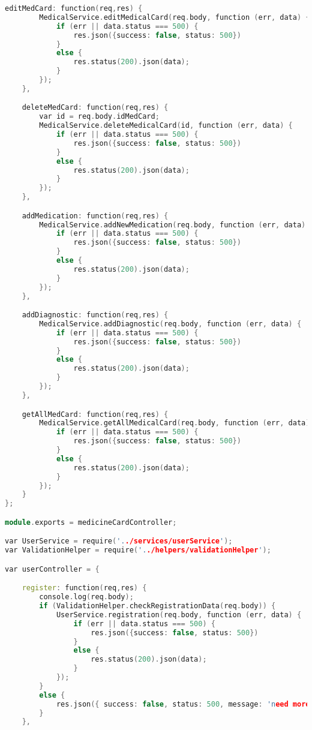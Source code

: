 \begin{lstlisting}[language=C++, style=cplusplusstyle]
    editMedCard: function(req,res) {
        MedicalService.editMedicalCard(req.body, function (err, data) {
            if (err || data.status === 500) {
                res.json({success: false, status: 500})
            }
            else {
                res.status(200).json(data);
            }
        });
    },

    deleteMedCard: function(req,res) {
        var id = req.body.idMedCard;
        MedicalService.deleteMedicalCard(id, function (err, data) {
            if (err || data.status === 500) {
                res.json({success: false, status: 500})
            }
            else {
                res.status(200).json(data);
            }
        });
    },

    addMedication: function(req,res) {
        MedicalService.addNewMedication(req.body, function (err, data) {
            if (err || data.status === 500) {
                res.json({success: false, status: 500})
            }
            else {
                res.status(200).json(data);
            }
        });
    },

    addDiagnostic: function(req,res) {
        MedicalService.addDiagnostic(req.body, function (err, data) {
            if (err || data.status === 500) {
                res.json({success: false, status: 500})
            }
            else {
                res.status(200).json(data);
            }
        });
    },

    getAllMedCard: function(req,res) {
        MedicalService.getAllMedicalCard(req.body, function (err, data) {
            if (err || data.status === 500) {
                res.json({success: false, status: 500})
            }
            else {
                res.status(200).json(data);
            }
        });
    }
};

module.exports = medicineCardController;

var UserService = require('../services/userService');
var ValidationHelper = require('../helpers/validationHelper');

var userController = {

    register: function(req,res) {
        console.log(req.body);
        if (ValidationHelper.checkRegistrationData(req.body)) {
            UserService.registration(req.body, function (err, data) {
                if (err || data.status === 500) {
                    res.json({success: false, status: 500})
                }
                else {
                    res.status(200).json(data);
                }
            });
        }
        else {
            res.json({ success: false, status: 500, message: 'need more info' })
        }
    },


\end{lstlisting}
